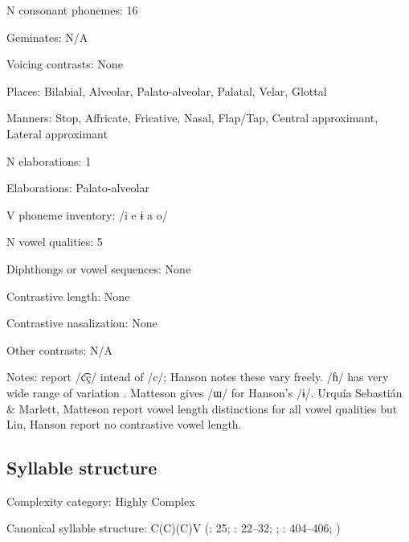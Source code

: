 {\begin{appendixdesc}
\item[N consonant phonemes:] 16

\item[Geminates:] N/A

\item[Voicing contrasts:] None

\item[Places:] Bilabial, Alveolar, Palato-alveolar, Palatal, Velar, Glottal

\item[Manners:] Stop, Affricate, Fricative, Nasal, Flap/Tap, Central approximant, Lateral approximant

\item[N elaborations:] 1

\item[Elaborations:] Palato-alveolar

\item[V phoneme inventory:] /i e ɨ a o/

\item[N vowel qualities:] 5

\item[Diphthongs or vowel sequences:] None

\item[Contrastive length:] None

\item[Contrastive nasalization:] None

\item[Other contrasts:] N/A

\item[Notes:]  \citet{UrquíaSebastiánMarlett2008} report /c͡ç/ intead of /c/; Hanson notes these vary freely. /ɦ/ has very wide range of variation \citep[20--23]{Hanson2010}. Matteson gives /ɯ/ for Hanson’s /ɨ/. Urquía Sebastián \& Marlett, Matteson report vowel length distinctions for all vowel qualities but Lin, Hanson report no contrastive vowel length.
\end{appendixdesc}
\subsection*{Syllable structure}
\begin{appendixdesc}

\item[Complexity category:] Highly Complex

\item[Canonical syllable structure:] C(C)(C)V (\citealt{Hanson2010}: 25; \citealt{Matteson1965}: 22--32; \citealt{MattesonPike1958}; \citealt{Lin1997}: 404--406; \citealt{Lin1993})


\end{appendixdesc}}

